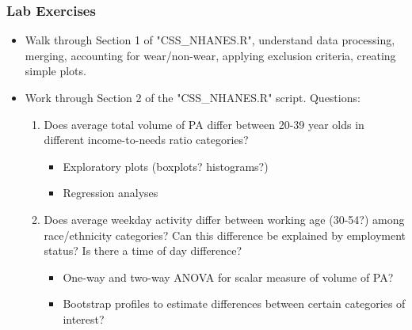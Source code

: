 \documentclass[10pt]{beamer}\usepackage[]{graphicx}\usepackage[]{color}
\begin{document}
\begin{frame}
\frametitle{Lab Exercises}
\begin{itemize}

\item Walk through Section 1 of "CSS\_NHANES.R", understand data processing, merging, accounting for wear/non-wear, applying exclusion criteria, 
creating simple plots.
\item Work through Section 2 of the "CSS\_NHANES.R" script. Questions:
    \begin{enumerate}
    \item Does average total volume of PA differ between 20-39 year olds in different income-to-needs ratio categories? 
        \begin{itemize}
        \item Exploratory plots (boxplots? histograms?)
        \item Regression analyses 
        \end{itemize}
    \item Does average weekday activity differ between working age (30-54?) among race/ethnicity categories? Can this difference be explained by 
    employment status? Is there a time of day difference?
        \begin{itemize}
        \item One-way and two-way ANOVA for scalar measure of volume of PA?
        \item Bootstrap profiles to estimate differences between certain categories of interest?
        \end{itemize}
    \end{enumerate}
\end{itemize}
\end{frame}
\end{document}
